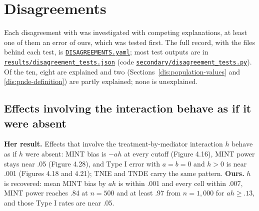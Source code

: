 \section{Disagreements}\label{sec:disagreements}

Each disagreement with \citet{chen2021} was investigated with competing explanations, at least one of them an error of ours, which was tested first. The full record, with the files behind each test, is \href{https://github.com/alectionary/vibe-math/blob/master/formalization/chen-rdd-mediation/DISAGREEMENTS.yaml}{\nolinkurl{DISAGREEMENTS.yaml}}; most test outputs are in \href{https://github.com/alectionary/vibe-math/blob/master/formalization/chen-rdd-mediation/results/disagreement_tests.json}{\nolinkurl{results/disagreement_tests.json}} (code \href{https://github.com/alectionary/vibe-math/blob/master/formalization/chen-rdd-mediation/secondary/disagreement_tests.py}{\nolinkurl{secondary/disagreement_tests.py}}). Of the ten, eight are explained and two (Sections~\ref{dis:population-values} and \ref{dis:pnde-definition}) are partly explained; none is unexplained.

\subsection{Effects involving the interaction behave as if it were absent}\label{dis:h-absent}

\textbf{Her result.} Effects that involve the treatment-by-mediator interaction $h$ behave as if $h$ were absent: MINT bias is $-ah$ at every cutoff (Figure 4.16), MINT power stays near .05 (Figure 4.28), and Type I error with $a = b = 0$ and $h > 0$ is near .001 (Figures 4.18 and 4.21); TNIE and TNDE carry the same pattern. \textbf{Ours.} $h$ is recovered: mean MINT bias by $ah$ is within .001 and every cell within .007, MINT power reaches .84 at $n = 500$ and at least .97 from $n = 1{,}000$ for $ah \ge .13$, and those Type I rates are near .05.

